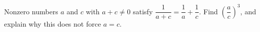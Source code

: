Nonzero numbers $a$ and $c$ with $a+c\ne0$ satisfy $\dfrac{1}{a+c}=\dfrac1a+\dfrac1c$. Find $\left(\dfrac ac\right)^3$, and explain why this does not force $a=c$.

